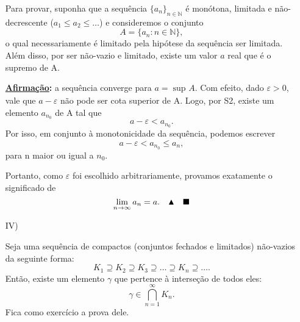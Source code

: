 \documentclass[../analysisII_notes.tex]{subfiles}
\begin{document}
\begin{itemize}
	      Para provar, suponha que a sequência \(\{a_{n}\}_{n\in \mathbb{N}}\) é monótona, limitada e não-decrescente (\(a_1 \leq a_2\leq \dotsc \)) e consideremos o conjunto
	      \[
		      A = \{a_{n}:n\in \mathbb{N}\},
	      \]
	      o qual necessariamente é limitado pela hipótese da sequência ser limitada. Além disso, por ser não-vazio e limitado, existe um valor \(a\) real que é o supremo de A.

	      \textbf{\underline{Afirmação}:} a sequência converge para \(a = \sup_{}A\). Com efeito, dado \(\varepsilon > 0\), vale que \(a-\varepsilon\) não pode ser cota superior de A. Logo, por S2, existe um elemento \(a_{n_{0}}\) de A tal que
	      \[
		      a-\varepsilon < a_{n_{0}}.
	      \]
	      Por isso, em conjunto à monotonicidade da sequência, podemos escrever
	      \[
		      a-\varepsilon < a_{n_{0}}\leq a_{n},
	      \]
	      para n maior ou igual a \(n_{0}\).

	      Portanto, como \(\varepsilon \) foi escolhido arbitrariamente, provamos exatamente o significado de
	      \[
		      \lim_{n\to \infty}a_{n} = a. \quad \blacktriangle \quad  \text{$\blacksquare$}
	      \]
	\item[IV)]
	      \begin{exr}
		      Seja uma sequência de compactos (conjuntos fechados e limitados) não-vazios da seguinte forma:
		      \[
			      K_1 \supseteq K_2 \supseteq K_3 \supseteq \dotsc \supseteq K_{n}\supseteq \dotsc.
		      \]
		      Então, existe um elemento \(\gamma \) que pertence à interseção de todos eles:
		      \[
			      \gamma \in \bigcap_{n=1}^{\infty}K_{n}.
		      \]
		      Fica como exercício a prova dele.
	      \end{exr}
\end{itemize}
\end{document}
